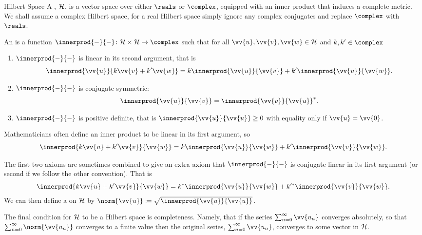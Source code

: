 \begin{dfn}{Hilbert Space}{}
    A , \(\mathcal{H}\), is a vector space over either \(\reals\) or \(\complex\), equipped with an inner product that induces a complete metric.
    We shall assume a complex Hilbert space, for a real Hilbert space simply ignore any complex conjugates and replace \(\complex\) with \(\reals\).
    
    An  is a function \(\innerprod{-}{-} \colon \hilbert \times \hilbert \to \complex\) such that for all \(\vv{u}, \vv{v}, \vv{w} \in \hilbert\) and \(k, k' \in \complex\)
    \begin{enumerate}
        \item \(\innerprod{-}{-}\) is linear in its second argument, that is
        \begin{equation}
            \innerprod{\vv{u}}{k\vv{v} + k'\vv{w}} = k\innerprod{\vv{u}}{\vv{v}} + k'\innerprod{\vv{u}}{\vv{w}}.
        \end{equation}
        \item \(\innerprod{-}{-}\) is conjugate symmetric:
        \begin{equation}
            \innerprod{\vv{u}}{\vv{v}} = \innerprod{\vv{v}}{\vv{u}}^*.
        \end{equation}
        \item \(\innerprod{-}{-}\) is positive definite, that is \(\innerprod{\vv{u}}{\vv{u}} \ge 0\) with equality only if \(\vv{u} = \vv{0}\).
    \end{enumerate}
    \begin{wrn}
        Mathematicians often define an inner product to be linear in its first argument, so
        \begin{equation}
            \innerprod{k\vv{u} + k'\vv{v}}{\vv{w}} = k\innerprod{\vv{u}}{\vv{w}} + k'\innerprod{\vv{v}}{\vv{w}}.
        \end{equation}
    \end{wrn}
    The first two axioms are sometimes combined to give an extra axiom that \(\innerprod{-}{-}\) is conjugate linear in its first argument (or second if we follow the other convention).
    That is
    \begin{equation}
        \innerprod{k\vv{u} + k'\vv{v}}{\vv{w}} = k^*\innerprod{\vv{u}}{\vv{w}} + k'^*\innerprod{\vv{v}}{\vv{w}}.
    \end{equation}
    We can then define a  on \(\mathcal{H}\) by \(\norm{\vv{u}} \coloneqq \sqrt{\innerprod{\vv{u}}{\vv{u}}}\).
    
    The final condition for \(\mathcal{H}\) to be a Hilbert space is completeness.
    Namely, that if the series \(\sum_{n=0}^{\infty} \vv{u_n}\) converges absolutely, so that \(\sum_{n=0}^{\infty} \norm{\vv{u_n}}\) converges to a finite value then the original series, \(\sum_{n=0}^{\infty} \vv{u_n}\), converges to some vector in \(\mathcal{H}\).
\end{dfn}

